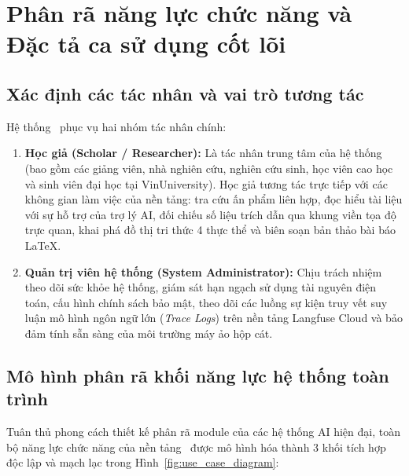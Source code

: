 \section{Phân rã năng lực chức năng và Đặc tả ca sử dụng cốt lõi}
\label{sec:use_case}

\subsection{Xác định các tác nhân và vai trò tương tác}
\label{subsec:tac_nhan}
Hệ thống \VS\ phục vụ hai nhóm tác nhân chính:
\begin{enumerate}[label=\textbf{(\arabic*)}]
    \item \textbf{Học giả (Scholar / Researcher):} Là tác nhân trung tâm của hệ thống (bao gồm các giảng viên, nhà nghiên cứu, nghiên cứu sinh, học viên cao học và sinh viên đại học tại VinUniversity). Học giả tương tác trực tiếp với các không gian làm việc của nền tảng: tra cứu ấn phẩm liên hợp, đọc hiểu tài liệu với sự hỗ trợ của trợ lý AI, đối chiếu số liệu trích dẫn qua khung viền tọa độ trực quan, khai phá đồ thị tri thức 4 thực thể và biên soạn bản thảo bài báo \LaTeX.
    \item \textbf{Quản trị viên hệ thống (System Administrator):} Chịu trách nhiệm theo dõi sức khỏe hệ thống, giám sát hạn ngạch sử dụng tài nguyên điện toán, cấu hình chính sách bảo mật, theo dõi các luồng sự kiện truy vết suy luận mô hình ngôn ngữ lớn (\textit{Trace Logs}) trên nền tảng Langfuse Cloud và bảo đảm tính sẵn sàng của môi trường máy ảo hộp cát.
\end{enumerate}

\subsection{Mô hình phân rã khối năng lực hệ thống toàn trình}
\label{subsec:bieu_do_uc}
Tuân thủ phong cách thiết kế phân rã module của các hệ thống AI hiện đại, toàn bộ năng lực chức năng của nền tảng \VS\ được mô hình hóa thành 3 khối tích hợp độc lập và mạch lạc trong Hình~\ref{fig:use_case_diagram}:

